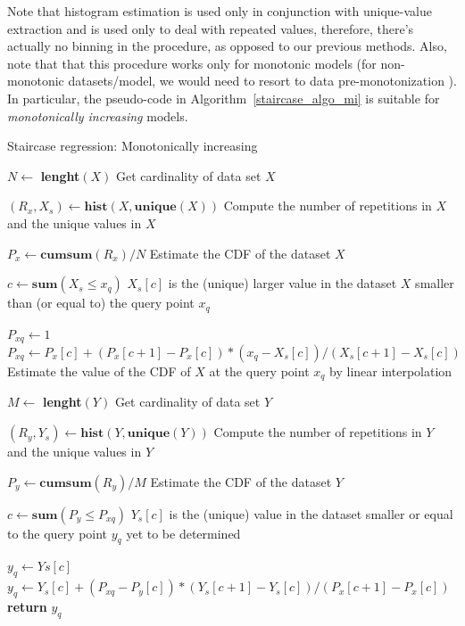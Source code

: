 \documentclass[10pt,final]{siamltex}
\begin{document}
{{Note that histogram estimation is used only in conjunction with unique-value extraction and is used only to deal with repeated values, therefore, there's actually no binning in the procedure, as opposed to our previous methods.
Also, note that that this procedure works only for monotonic models (for non-monotonic data\-sets/mo\-del, we would need to resort to data pre-monotonization \cite{fgl}). In particular, the pseudo-code in Algorithm~\ref{staircase_algo_mi} is suitable for \textit{monotonically increasing} models. 

%
\begin{algorithm}[t]
\caption{Staircase regression: Monotonically increasing}
\label{staircase_algo_mi}
\begin{algorithmic}[1]
    
    \State $N \gets$ \textbf{lenght}$(X)$ 
    \Comment Get cardinality of data set $X$
    
    \State $(R_x,X_s) \gets \textbf{hist}(X,\textbf{unique}(X))$
    \Comment Compute the number of repetitions in $X$ and the unique values in $X$

    \State $P_x \gets \mathbf{cumsum}(R_x)/N$
    \Comment Estimate the CDF of the dataset $X$
    
    \State $c \gets \mathbf{sum}(X_s \leq x_q)$
    \Comment $X_s[c]$ is the (unique) larger value in the dataset $X$ smaller than (or equal to) the query point $x_q$

      \State $P_{xq} \gets 1$
    \Else 
      \State $P_{xq} \gets P_x[c] + (P_x[c+1]-P_x[c])*(x_q-X_s[c])/(X_s[c+1]-X_s[c])$
    \EndIf
    \Comment Estimate the value of the CDF of $X$ at the query point $x_q$ by linear interpolation
    
    \State $M \gets$ \textbf{lenght}$(Y)$ 
    \Comment Get cardinality of data set $Y$  
    
    \State $(R_y,Y_s) \gets \textbf{hist}(Y,\textbf{unique}(Y))$
    \Comment Compute the number of repetitions in $Y$ and the unique values in $Y$

    \State $P_y \gets \mathbf{cumsum}(R_y)/M$
    \Comment Estimate the CDF of the dataset $Y$
    
    \State $c \gets \mathbf{sum}(P_y \leq P_{xq})$
    \Comment $Y_s[c]$ is the (unique) value in the dataset smaller or equal to the query point $y_q$ yet to be determined
    
        \State $y_q \gets Ys[c]$
    \Else
        \State $y_q \gets Y_s[c] + (P_{xq} - P_y[c])*(Y_s[c+1]-Y_s[c])/(P_x[c+1]-P_x[c])$
    \EndIf
    \State \textbf{return} $y_q$
\EndFunction
\end{algorithmic}
\end{algorithm}
%

}}
\end{document}

